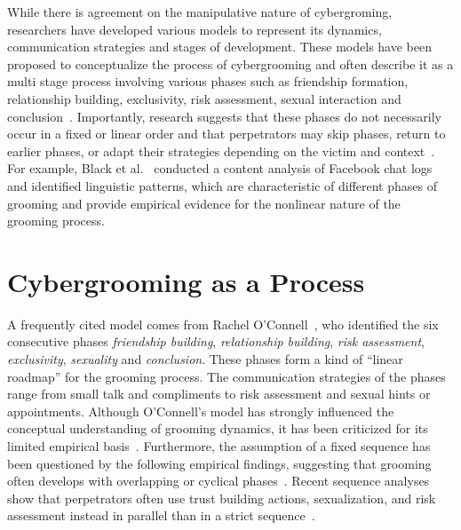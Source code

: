 While there is agreement on the manipulative nature of cybergroming, researchers have developed various models to represent its dynamics, communication strategies and stages of development\parencite{kloess2014online}. These models have been proposed to conceptualize the process of cybergrooming and often describe it as a multi stage process involving various phases such as friendship formation, relationship building, exclusivity, risk assessment, sexual interaction and conclusion~\cite{oconnell2003typology,whittle2013review,kloess2014online,chiangandgrant2017online}. Importantly, research suggests that these phases do not necessarily occur in a fixed or linear order and that perpetrators may skip phases, return to earlier phases, or adapt their strategies depending on the victim and context~\cite{whittle2013review,chiangandgrant2017online,Joleby2021offender}. For example, Black et al.~\cite{black2015linguistic} conducted a content analysis of Facebook chat logs and identified linguistic patterns, which are characteristic of different phases of grooming and provide empirical evidence for the nonlinear nature of the grooming process.

\section{Cybergrooming as a Process}

A frequently cited model comes from Rachel O’Connell~\cite{oconnell2003typology}, who identified the six consecutive phases \emph{friendship building}, \emph{relationship building}, \emph{risk assessment}, \emph{exclusivity}, \emph{sexuality} and \emph{conclusion}. These phases form a kind of “linear roadmap” for the grooming process. The communication strategies of the phases range from small talk and compliments to risk assessment and sexual hints or appointments. Although O'Connell's model has strongly influenced the conceptual understanding of grooming dynamics, it has been criticized for its limited empirical basis~\cite{broome2020psycholinguistic, LorenzoDus2019}. Furthermore, the assumption of a fixed sequence has been questioned by the following empirical findings, suggesting that grooming often develops with overlapping or cyclical phases~\cite{Joleby2021offender}. Recent sequence analyses show that perpetrators often use trust building actions, sexualization, and risk assessment instead in parallel than in a strict sequence~\cite{Ringenberg2024assessing}.

